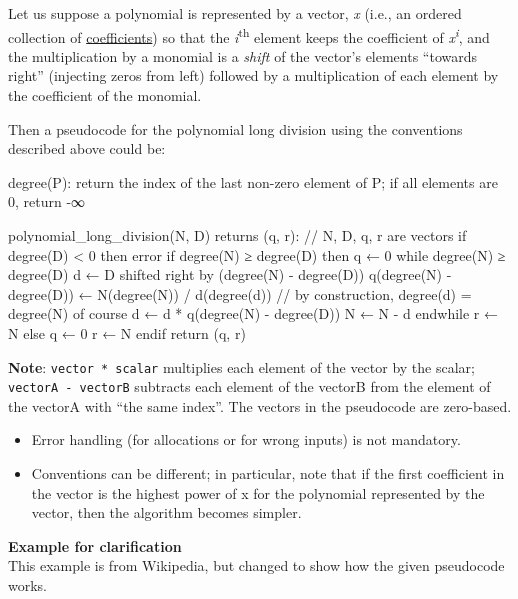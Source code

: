 Let us suppose a polynomial is represented by a vector, \emph{x} (i.e.,
an ordered collection of
\href{http://en.wikipedia.org/wiki/Coefficient}{coefficients}) so that
the \emph{i}\textsuperscript{th} element keeps the coefficient of
\emph{x}\textsuperscript{\emph{i}}, and the multiplication by a monomial
is a \emph{shift} of the vector's elements ``towards right'' (injecting
zeros from left) followed by a multiplication of each element by the
coefficient of the monomial.

Then a pseudocode for the polynomial long division using the conventions
described above could be:

\begin{wideverbatim}
degree(P):
  return the index of the last non-zero element of P;
         if all elements are 0, return -∞

polynomial_long_division(N, D) returns (q, r):
  // N, D, q, r are vectors
  if degree(D) < 0 then error
  if degree(N) ≥ degree(D) then
    q ← 0
    while degree(N) ≥ degree(D)
      d ← D shifted right by (degree(N) - degree(D))
      q(degree(N) - degree(D)) ← N(degree(N)) / d(degree(d))
      // by construction, degree(d) = degree(N) of course
      d ← d * q(degree(N) - degree(D))
      N ← N - d
    endwhile
    r ← N
  else
    q ← 0
    r ← N
  endif
  return (q, r)
\end{wideverbatim}

\pagebreak{}

\textbf{Note}: \texttt{vector * scalar} multiplies each element of the
vector by the scalar; \texttt{vectorA - vectorB} subtracts each element
of the vectorB from the element of the vectorA with ``the same index''.
The vectors in the pseudocode are zero-based.

\begin{itemize}
\item
  Error handling (for allocations or for wrong inputs) is not mandatory.
\item
  Conventions can be different; in particular, note that if the first
  coefficient in the vector is the highest power of x for the polynomial
  represented by the vector, then the algorithm becomes simpler.
\end{itemize}

\textbf{Example for clarification} \\ This example is from Wikipedia,
but changed to show how the given pseudocode works.

